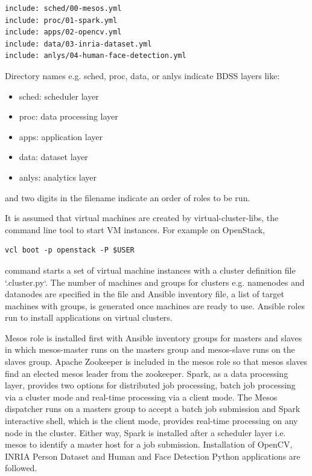\documentclass[9pt,twocolumn,twoside]{styles/osajnl}
\begin{document}
\begin{verbatim}
include: sched/00-mesos.yml
include: proc/01-spark.yml
include: apps/02-opencv.yml
include: data/03-inria-dataset.yml
include: anlys/04-human-face-detection.yml
\end{verbatim}
	

Directory names e.g. sched, proc, data, or anlys indicate BDSS layers like:
\begin{itemize}
\item sched: scheduler layer
\item proc: data processing layer
\item apps: application layer
\item data: dataset layer
\item anlys: analytics layer
\end{itemize}

and two digits in the filename indicate an order of roles to be run. 


It is assumed that virtual machines are created by
virtual-cluster-libs, the command line tool to start VM instances. For
example on OpenStack,

\begin{verbatim} 
vcl boot -p openstack -P $USER
\end{verbatim}

command starts a set of virtual machine instances with a cluster
definition file `.cluster.py`. The number of machines and groups for
clusters e.g. namenodes and datanodes are specified in the file and
Ansible inventory file, a list of target machines with groups, is
generated once machines are ready to use. Ansible roles run to install
applications on virtual clusters.


Mesos role is installed first with Ansible inventory groups for
masters and slaves in which mesos-master runs on the masters group and
mesos-slave runs on the slaves group. Apache Zookeeper is included in
the mesos role so that mesos slaves find an elected mesos leader from
the zookeeper. Spark, as a data processing layer, provides two options
for distributed job processing, batch job processing via a cluster
mode and real-time processing via a client mode. The Mesos dispatcher
runs on a masters group to accept a batch job submission and Spark
interactive shell, which is the client mode, provides real-time
processing on any node in the cluster. Either way, Spark is installed
after a scheduler layer i.e. mesos to identify a master host for a job
submission. Installation of OpenCV, INRIA Person Dataset and Human and
Face Detection Python applications are followed.
\end{document}
